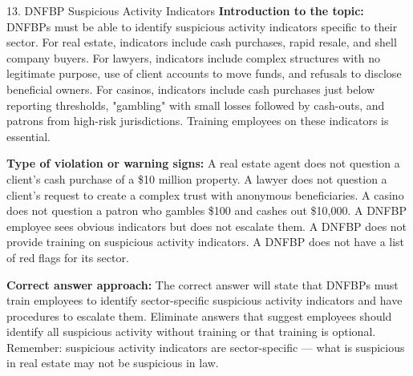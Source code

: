 \documentclass[11pt,a4paper]{beamer}
\begin{document}
\begin{frame}{13. DNFBP Suspicious Activity Indicators}
\tiny
\noindent\textbf{Introduction to the topic:} DNFBPs must be able to identify suspicious activity indicators specific to their sector. For real estate, indicators include cash purchases, rapid resale, and shell company buyers. For lawyers, indicators include complex structures with no legitimate purpose, use of client accounts to move funds, and refusals to disclose beneficial owners. For casinos, indicators include cash purchases just below reporting thresholds, "gambling" with small losses followed by cash-outs, and patrons from high-risk jurisdictions. Training employees on these indicators is essential.

\vspace{0.1cm}
\noindent\textbf{Type of violation or warning signs:} A real estate agent does not question a client's cash purchase of a \$10 million property. A lawyer does not question a client's request to create a complex trust with anonymous beneficiaries. A casino does not question a patron who gambles \$100 and cashes out \$10,000. A DNFBP employee sees obvious indicators but does not escalate them. A DNFBP does not provide training on suspicious activity indicators. A DNFBP does not have a list of red flags for its sector.

\vspace{0.1cm}
\noindent\textbf{Correct answer approach:} The correct answer will state that DNFBPs must train employees to identify sector-specific suspicious activity indicators and have procedures to escalate them. Eliminate answers that suggest employees should identify all suspicious activity without training or that training is optional. Remember: suspicious activity indicators are sector-specific — what is suspicious in real estate may not be suspicious in law.
\end{frame}
\end{document}

